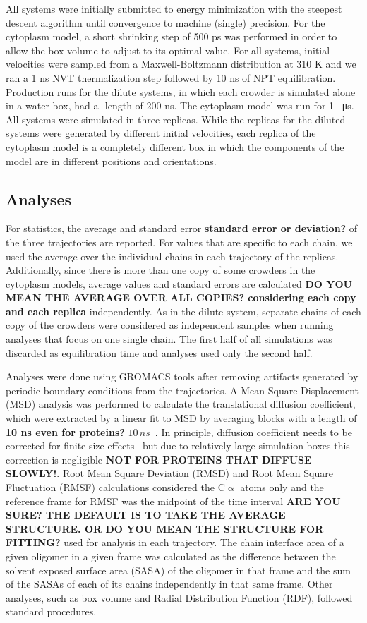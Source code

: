 \documentclass[journal=jcisd8,manuscript=article]{achemso}
\begin{document}
All systems were initially submitted to energy minimization with the
steepest descent algorithm until convergence to machine (single)
precision. For the cytoplasm model, a short shrinking step of 500 ps
was performed in order to allow the box volume to adjust to its
optimal value. For all systems, initial velocities were sampled from a
Maxwell-Boltzmann distribution at 310 K and we ran a 1 ns NVT
thermalization step followed by 10 ns of NPT equilibration. Production
runs for the dilute systems, in which each crowder is simulated alone
in a water box, had a- length of 200 ns. The cytoplasm model was run
for 1 \SI{}{\micro\second}. All systems were simulated in three
replicas. While the replicas for the diluted systems were generated by
different initial velocities, each replica of the cytoplasm model is a
completely different box in which the components of the model are in
different positions and orientations.

\subsection{Analyses}
For statistics, the average and standard error {\bf standard error or
  deviation?} of the three trajectories are reported. For values that
are specific to each chain, we used the average over the individual
chains in each trajectory of the replicas. Additionally, since there
is more than one copy of some crowders in the cytoplasm models,
average values and standard errors are calculated {\bf DO YOU MEAN THE
  AVERAGE OVER ALL COPIES? considering each copy and each replica}
independently. As in the dilute system, separate chains of each copy
of the crowders were considered as independent samples when running
analyses that focus on one single chain. The first half of all
simulations was discarded as equilibration time and analyses used only
the second half.

Analyses were done using GROMACS tools after removing artifacts
generated by periodic boundary conditions from the trajectories. A
Mean Square Displacement (MSD) analysis was performed to calculate the
translational diffusion coefficient, which were extracted by a linear
fit to MSD by averaging blocks with a length of {\bf 10 ns even for
  proteins?}  $10\,ns$~\cite{Allen1987a}. In principle, diffusion
coefficient needs to be corrected for finite size
effects~\cite{Yeh2004} but due to relatively large simulation boxes
this correction is negligible {\bf NOT FOR PROTEINS THAT DIFFUSE
  SLOWLY!}. Root Mean Square Deviation (RMSD) and Root Mean Square
Fluctuation (RMSF) calculations considered the C$\upalpha$ atoms only
and the reference frame for RMSF was the midpoint of the time interval
{\bf ARE YOU SURE? THE DEFAULT IS TO TAKE THE AVERAGE STRUCTURE. OR DO
  YOU MEAN THE STRUCTURE FOR FITTING?} used for analysis in each
trajectory. The chain interface area of a given oligomer in a given
frame was calculated as the difference between the solvent exposed
surface area (SASA) of the oligomer in that frame and the sum of the
SASAs of each of its chains independently in that same frame. Other
analyses, such as box volume and Radial Distribution Function (RDF),
followed standard procedures.
\end{document}
